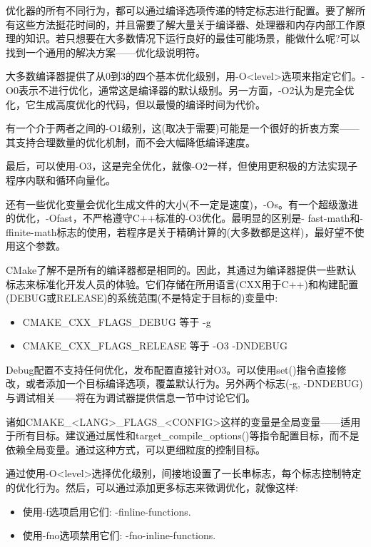 
优化器的所有不同行为，都可以通过编译选项传递的特定标志进行配置。要了解所有这些方法挺花时间的，并且需要了解大量关于编译器、处理器和内存内部工作原理的知识。若只想要在大多数情况下运行良好的最佳可能场景，能做什么呢?可以找到一个通用的解决方案——优化级说明符。

大多数编译器提供了从0到3的四个基本优化级别，用-O<level>选项来指定它们。-O0表示不进行优化，通常这是编译器的默认级别。另一方面，-O2认为是完全优化，它生成高度优化的代码，但以最慢的编译时间为代价。

有一个介于两者之间的-O1级别，这(取决于需要)可能是一个很好的折衷方案——其支持合理数量的优化机制，而不会大幅降低编译速度。

最后，可以使用-O3，这是完全优化，就像-O2一样，但使用更积极的方法实现子程序内联和循环向量化。

还有一些优化变量会优化生成文件的大小(不一定是速度)，-Os。有一个超级激进的优化，-Ofast，不严格遵守C++标准的-O3优化。最明显的区别是- fast-math和-ffinite-math标志的使用，若程序是关于精确计算的(大多数都是这样)，最好望不使用这个参数。

CMake了解不是所有的编译器都是相同的。因此，其通过为编译器提供一些默认标志来标准化开发人员的体验。它们存储在所用语言(CXX用于C++)和构建配置(DEBUG或RELEASE)的系统范围(不是特定于目标的)变量中:

\begin{itemize}
\item 
CMAKE\_CXX\_FLAGS\_DEBUG 等于 -g

\item 
CMAKE\_CXX\_FLAGS\_RELEASE 等于 -O3 -DNDEBUG
\end{itemize}

Debug配置不支持任何优化，发布配置直接针对O3。可以使用set()指令直接修改，或者添加一个目标编译选项，覆盖默认行为。另外两个标志(-g, -DNDEBUG)与调试相关——将在为调试器提供信息一节中讨论它们。

诸如CMAKE\_<LANG>\_FLAGS\_<CONFIG>这样的变量是全局变量——适用于所有目标。建议通过属性和target\_compile\_options()等指令配置目标，而不是依赖全局变量。通过这种方式，可以更细粒度的控制目标。

通过使用-O<level>选择优化级别，间接地设置了一长串标志，每个标志控制特定的优化行为。然后，可以通过添加更多标志来微调优化，就像这样:

\begin{itemize}
\item 
使用-f选项启用它们: -finline-functions.
	
\item 
使用-fno选项禁用它们: -fno-inline-functions.
\end{itemize}

